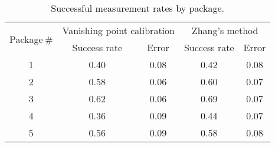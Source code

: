 \begin{table}
\centering
\begin{tabular}{@{} *5c @{}}
\toprule
\multirow{2}{*}{Package$~\#$} & \multicolumn{2}{c}{Vanishing point calibration} & \multicolumn{2}{c}{Zhang's method}\\ 
\cmidrule(r){2-3}
\cmidrule(r){4-5}
& Success rate & Error & Success rate & Error \\
\midrule
 1 & 0.40 & 0.08 & 0.42 & 0.08 \\ 
 2 & 0.58 & 0.06 & 0.60 & 0.07 \\
 3 & 0.62 & 0.06 & 0.69 & 0.07 \\
 4 & 0.36 & 0.09 & 0.44 & 0.07 \\
 5 & 0.56 & 0.09 & 0.58 & 0.08 \\
\bottomrule 
 \end{tabular}
 \caption{Successful measurement rates by package.}
\label{table:measurement_by_package}
\end{table}

